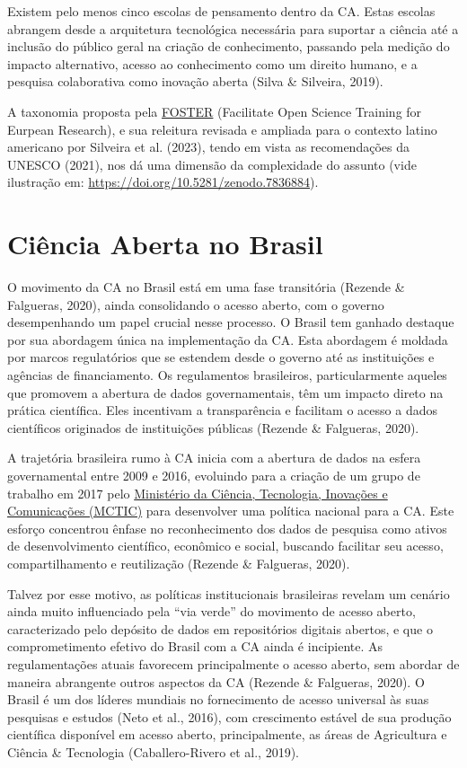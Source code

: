 \documentclass[
  a4paper,
]{book}
\begin{document}
Existem pelo menos cinco escolas de pensamento dentro da CA. Estas
escolas abrangem desde a arquitetura tecnológica necessária para
suportar a ciência até a inclusão do público geral na criação de
conhecimento, passando pela medição do impacto alternativo, acesso ao
conhecimento como um direito humano, e a pesquisa colaborativa como
inovação aberta (Silva \& Silveira, 2019).

A taxonomia proposta pela
\href{https://openscience.eu/article/project/foster}{FOSTER} (Facilitate
Open Science Training for Eurpean Research), e sua releitura revisada e
ampliada para o contexto latino americano por Silveira et al. (2023),
tendo em vista as recomendações da UNESCO (2021), nos dá uma dimensão da
complexidade do assunto (vide ilustração em:
\url{https://doi.org/10.5281/zenodo.7836884}).

\section{Ciência Aberta no Brasil}\label{ciuxeancia-aberta-no-brasil}

O movimento da CA no Brasil está em uma fase transitória (Rezende \&
Falgueras, 2020), ainda consolidando o acesso aberto, com o governo
desempenhando um papel crucial nesse processo. O Brasil tem ganhado
destaque por sua abordagem única na implementação da CA. Esta abordagem
é moldada por marcos regulatórios que se estendem desde o governo até as
instituições e agências de financiamento. Os regulamentos brasileiros,
particularmente aqueles que promovem a abertura de dados governamentais,
têm um impacto direto na prática científica. Eles incentivam a
transparência e facilitam o acesso a dados científicos originados de
instituições públicas (Rezende \& Falgueras, 2020).

A trajetória brasileira rumo à CA inicia com a abertura de dados na
esfera governamental entre 2009 e 2016, evoluindo para a criação de um
grupo de trabalho em 2017 pelo
\href{https://www.gov.br/mcti/pt-br}{Ministério da Ciência, Tecnologia,
Inovações e Comunicações (MCTIC)} para desenvolver uma política nacional
para a CA. Este esforço concentrou ênfase no reconhecimento dos dados de
pesquisa como ativos de desenvolvimento científico, econômico e social,
buscando facilitar seu acesso, compartilhamento e reutilização (Rezende
\& Falgueras, 2020).

Talvez por esse motivo, as políticas institucionais brasileiras revelam
um cenário ainda muito influenciado pela ``via verde'' do movimento de
acesso aberto, caracterizado pelo depósito de dados em repositórios
digitais abertos, e que o comprometimento efetivo do Brasil com a CA
ainda é incipiente. As regulamentações atuais favorecem principalmente o
acesso aberto, sem abordar de maneira abrangente outros aspectos da CA
(Rezende \& Falgueras, 2020). O Brasil é um dos líderes mundiais no
fornecimento de acesso universal às suas pesquisas e estudos (Neto et
al., 2016), com crescimento estável de sua produção científica
disponível em acesso aberto, principalmente, as áreas de Agricultura e
Ciência \& Tecnologia (Caballero-Rivero et al., 2019).
\end{document}
